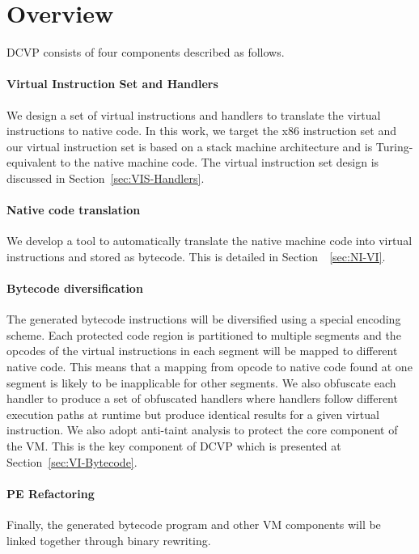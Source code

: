 \section{Overview}\label{sec:overview}
DCVP consists of four components described as follows.

\paragraph{Virtual Instruction Set and Handlers} 
We design a set of virtual instructions and handlers to translate the virtual instructions to native code.
In this work, we target the x86 instruction set and our virtual instruction set is based on a stack machine architecture and is Turing-equivalent to the native machine code. 
The virtual instruction set design is discussed in Section~\ref{sec:VIS-Handlers}.

\paragraph{Native code translation} 
We develop a tool to automatically translate the native machine code into virtual instructions and stored as bytecode. 
This is detailed in Section~~\ref{sec:NI-VI}.

\paragraph{Bytecode diversification} 
The generated bytecode instructions will be diversified using a special encoding scheme. 
Each protected code region is partitioned to multiple segments and the opcodes of the virtual instructions in each segment will be mapped to different native code. 
This means that a mapping from opcode to native code found at one segment is likely to be inapplicable for other segments. 
We also obfuscate each handler to produce a set of obfuscated handlers where handlers follow different execution paths at runtime but produce identical results for a given virtual instruction. 
We also adopt anti-taint analysis to protect the core component of the VM. 
This is the key component of DCVP which is presented at Section~\ref{sec:VI-Bytecode}.

\paragraph{PE Refactoring}
Finally, the generated bytecode program and other VM components will be linked together through binary rewriting.


